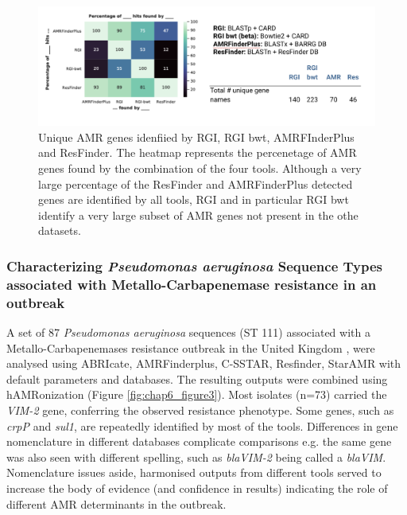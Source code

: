 \begin{figure}[]
\centering
\includegraphics[width=\textwidth]{figures/chapter 6/Fig 2.png}
\caption{Unique AMR genes idenfiied by RGI, RGI bwt, AMRFInderPlus and ResFinder. The heatmap represents the percenetage of AMR genes found by the combination of the four tools. Although a very large percentage of the ResFinder and AMRFinderPlus detected genes are identified by all tools, RGI and in particular RGI bwt identify a very large subset of AMR genes not present in the othe datasets.}
\label{fig:chap6_figure2}
\end{figure}

\subsubsection{Characterizing \textit{Pseudomonas aeruginosa} Sequence Types associated with Metallo-Carbapenemase resistance in an outbreak}

A set of 87 \textit{Pseudomonas aeruginosa} sequences (ST 111) associated with a Metallo-Carbapenemases resistance outbreak in the United Kingdom \cite{witney_genome_2014}, were analysed using ABRIcate, AMRFinderplus, C-SSTAR, Resfinder, StarAMR with default parameters and databases. The resulting outputs were combined using hAMRonization (Figure \ref{fig:chap6_figure3}). Most isolates (n=73) carried the \textit{VIM-2} gene, conferring the observed resistance phenotype. Some genes, such as \textit{crpP} and \textit{sul1},  are repeatedly identified by most of the tools. Differences in gene nomenclature in different databases complicate comparisons e.g. the same gene was also seen with different spelling, such as \textit{blaVIM-2} being called a \textit{blaVIM}. Nomenclature issues aside, harmonised outputs from different tools served to increase the body of evidence (and confidence in results) indicating the role of different AMR determinants in the outbreak.

